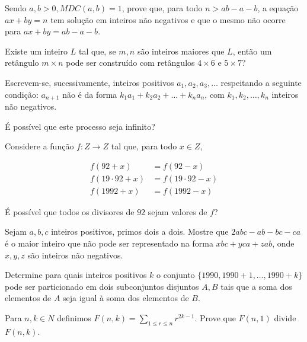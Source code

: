 \begin{questao}
  Sendo $a,b>0, MDC(a,b)=1$, prove que, para todo $n > ab-a-b$,
  a equação $ax+by=n$ tem solução em inteiros não negativos e que o
  mesmo não ocorre para $ax+by=ab-a-b$.
\end{questao}

\begin{questao}
  Existe um inteiro $L$ tal que, se $m,n$ são inteiros maiores que
  $L$, então um retângulo $m \times n$ pode ser construído com
  retângulos $4 \times 6$ e $5 \times 7$?
\end{questao}

\begin{questao}
  Escrevem-se, sucessivamente, inteiros positivos
  $a_1,a_2,a_3,\ldots$ respeitando a seguinte condição: $a_{n+1}$
  não é da forma $k_1a_1+k_2a_2+\ldots+k_na_n$, com
  $k_1,k_2,\ldots,k_n$ inteiros não negativos.

  É possível que este processo seja infinito?
\end{questao}

\begin{questao}
  Considere a função $f:Z \rightarrow Z$ tal que, para todo $x \in
  Z$,

  \begin{align*}
    f(92+x) & = f(92-x) \\
    f(19 \cdot 92+x) & = f(19 \cdot 92-x) \\
    f(1992+x) & = f(1992-x)
  \end{align*}

  É possível que todos os divisores de $92$ sejam valores de $f$?
\end{questao}

\begin{questao}
  Sejam $a,b,c$ inteiros positivos, primos dois a dois. Mostre que
  $2abc-ab-bc-ca$ é o maior inteiro que não pode ser representado na
  forma $xbc+yca+zab$, onde $x,y,z$ são inteiros não negativos.
\end{questao}

\begin{questao}
  Determine para quais inteiros positivos $k$ o conjunto $\{1990,
  1990+1, \ldots, 1990+k\}$ pode ser particionado em dois
  subconjuntos disjuntos $A,B$ tais que a soma dos elementos de
  $A$ seja igual à soma dos elementos de $B$.
\end{questao}

\begin{questao}
  Para $n,k \in N$ definimos $F(n,k) = \sum_{1 \leq r \leq n
  }{r^{2k-1}}$. Prove que $F(n,1)$ divide $F(n,k)$.
\end{questao}

